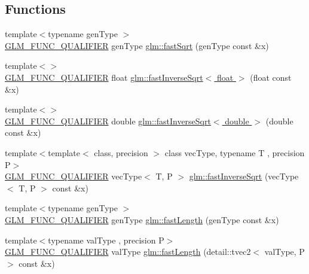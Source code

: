 \subsection*{Functions}
\begin{DoxyCompactItemize}
\item 
{\footnotesize template$<$typename gen\+Type $>$ }\\\hyperlink{setup_8hpp_a33fdea6f91c5f834105f7415e2a64407}{G\+L\+M\+\_\+\+F\+U\+N\+C\+\_\+\+Q\+U\+A\+L\+I\+F\+I\+ER} gen\+Type \hyperlink{group__gtx__fast__square__root_gab07ddede2731f3438d687a652c843673}{glm\+::fast\+Sqrt} (gen\+Type const \&x)
\item 
{\footnotesize template$<$$>$ }\\\hyperlink{setup_8hpp_a33fdea6f91c5f834105f7415e2a64407}{G\+L\+M\+\_\+\+F\+U\+N\+C\+\_\+\+Q\+U\+A\+L\+I\+F\+I\+ER} float \hyperlink{namespaceglm_a3c4d65bdc005cd73dd36a5bccbda7404}{glm\+::fast\+Inverse\+Sqrt$<$ float $>$} (float const \&x)
\item 
{\footnotesize template$<$$>$ }\\\hyperlink{setup_8hpp_a33fdea6f91c5f834105f7415e2a64407}{G\+L\+M\+\_\+\+F\+U\+N\+C\+\_\+\+Q\+U\+A\+L\+I\+F\+I\+ER} double \hyperlink{namespaceglm_aac78c01dd432421901cd0ae70ad5cc7b}{glm\+::fast\+Inverse\+Sqrt$<$ double $>$} (double const \&x)
\item 
{\footnotesize template$<$template$<$ class, precision $>$ class vec\+Type, typename T , precision P$>$ }\\\hyperlink{setup_8hpp_a33fdea6f91c5f834105f7415e2a64407}{G\+L\+M\+\_\+\+F\+U\+N\+C\+\_\+\+Q\+U\+A\+L\+I\+F\+I\+ER} vec\+Type$<$ T, P $>$ \hyperlink{group__gtx__fast__square__root_ga903878071f92e51e551791e584a171a1}{glm\+::fast\+Inverse\+Sqrt} (vec\+Type$<$ T, P $>$ const \&x)
\item 
{\footnotesize template$<$typename gen\+Type $>$ }\\\hyperlink{setup_8hpp_a33fdea6f91c5f834105f7415e2a64407}{G\+L\+M\+\_\+\+F\+U\+N\+C\+\_\+\+Q\+U\+A\+L\+I\+F\+I\+ER} gen\+Type \hyperlink{group__gtx__fast__square__root_ga70aa3c80d8bb22e021c6c3ebdcf8e3ee}{glm\+::fast\+Length} (gen\+Type const \&x)
\item 
{\footnotesize template$<$typename val\+Type , precision P$>$ }\\\hyperlink{setup_8hpp_a33fdea6f91c5f834105f7415e2a64407}{G\+L\+M\+\_\+\+F\+U\+N\+C\+\_\+\+Q\+U\+A\+L\+I\+F\+I\+ER} val\+Type \hyperlink{namespaceglm_a37a797293ad5fb1be42bac6e9bc93954}{glm\+::fast\+Length} (detail\+::tvec2$<$ val\+Type, P $>$ const \&x)

\end{DoxyCompactItemize}
